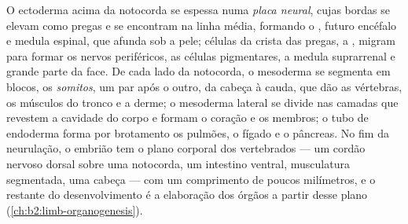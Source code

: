 \begin{proposition}\label{prop:b2:vertebrate-development:neurulation}
O ectoderma acima da notocorda se espessa numa \emph{placa neural},
cujas bordas se elevam como pregas e se encontram na linha média,
formando o \emph{}, futuro encéfalo e medula espinal, que
afunda sob a pele; células da crista das pregas, a \emph{}, migram para formar os nervos periféricos, as células
pigmentares, a medula suprarrenal e grande parte da face. De cada lado
da notocorda, o mesoderma se segmenta em blocos, os \emph{somitos}, um
par após o outro, da cabeça à cauda, que dão as vértebras, os músculos
do tronco e a derme; o mesoderma lateral se divide nas camadas que
revestem a cavidade do corpo e formam o coração e os membros; o tubo
de endoderma forma por brotamento os pulmões, o fígado e o pâncreas. No
fim da neurulação, o embrião tem o plano corporal dos vertebrados ---
um cordão nervoso dorsal sobre uma notocorda, um intestino ventral,
musculatura segmentada, uma cabeça --- com um comprimento de poucos
milímetros, e o restante do desenvolvimento é a elaboração dos órgãos a
partir desse plano (\cref{ch:b2:limb-organogenesis}).
\end{proposition}

